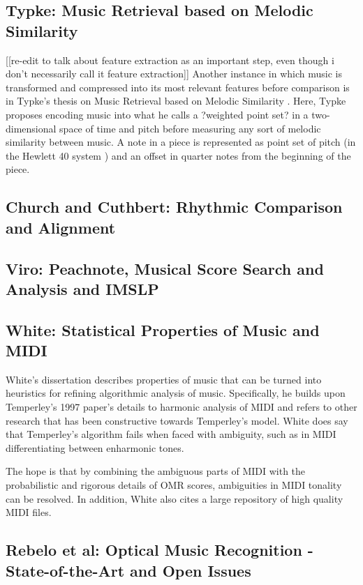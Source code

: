 \subsection{Typke: Music Retrieval based on Melodic Similarity}
[[re-edit to talk about feature extraction as an important step, even though i don't necessarily call it feature extraction]]
Another instance in which music is transformed and compressed into its most relevant features before comparison is in Typke's thesis on Music Retrieval based on Melodic Similarity \cite{typke-2007}. Here, Typke proposes encoding music into what he calls a ?weighted point set? in a two-dimensional space of time and pitch before measuring any sort of melodic similarity between music. A note in a piece is represented as point set of pitch (in the Hewlett 40 system \cite{typke-2007}) and an offset in quarter notes from the beginning of the piece.

\subsection{Church and Cuthbert: Rhythmic Comparison and Alignment}
\subsection{Viro: Peachnote, Musical Score Search and Analysis and IMSLP}
\subsection{White: Statistical Properties of Music and MIDI}
White's dissertation \cite{tonality} describes properties of music that can be turned into heuristics for refining algorithmic analysis of music. Specifically, he builds upon Temperley's 1997 \cite{1997} paper's details to harmonic analysis of MIDI and refers to other research that has been constructive towards Temperley's model. White does say that Temperley's algorithm fails when faced with ambiguity, such as in MIDI differentiating between enharmonic tones. 

The hope is that by combining the ambiguous parts of MIDI with the probabilistic and rigorous details of OMR scores, ambiguities in MIDI tonality can be resolved. In addition, White also cites a large repository of high quality MIDI files. 
\subsection{Rebelo et al: Optical Music Recognition - State-of-the-Art and Open Issues}